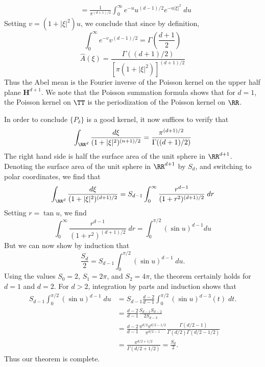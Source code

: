 \begin{example}
\begin{align*}
        &= \frac{1}{\pi^{(d + 1)/2}} \int_0^\infty e^{-u} u^{(d-1)/2} e^{- u|\xi|^2}\; du
    \end{align*}
    Setting $v = (1 + |\xi|^2) u$, we conclude that since by definition,
    \[ \int_0^\infty e^{-v} v^{(d-1)/2} = \Gamma \left( \frac{d+1}{2} \right) \]
    \[ \widehat{A}(\xi) = \frac{\Gamma((d+1)/2)}{[\pi(1 + |\xi|^2)]^{(d+1)/2}} \]
    Thus the Abel mean is the Fourier inverse of the Poisson kernel on the upper half plane $\mathbf{H}^{d+1}$. We note that the Poisson summation formula shows that for $d = 1$, the Poisson kernel on $\TT$ is the periodization of the Poisson kernel on $\RR$.

    In order to conclude $\{ P_\delta \}$ is a good kernel, it now suffices to verify that
    \[ \int_{\RR^d} \frac{d\xi}{(1 + |\xi|^2)^{(n+1)/2}} = \frac{\pi^{(d+1)/2}}{\Gamma((d+1)/2)} \]
    The right hand side is half the surface area of the unit sphere in $\RR^{d+1}$. Denoting the surface area of the unit sphere in $\RR^{d+1}$ by $S_d$, and switching to polar coordinates, we find that
    \[ \int_{\RR^d} \frac{d\xi}{(1 + |\xi|^2)^{(d+1)/2}} = S_{d-1} \int_0^\infty \frac{r^{d-1}}{(1 + r^2)^{(d+1)/2}}\; dr \]
    Setting $r = \tan u$, we find
    \[ \int_0^\infty \frac{r^{d-1}}{(1 + r^2)^{(d+1)/2}}\; dr = \int_0^{\pi/2} (\sin u)^{d-1} du \]
    But we can now show by induction that
    \[ \frac{S_d}{2} = S_{d-1} \int_0^{\pi/2} (\sin u)^{d-1}\; du. \]
    Using the values $S_0 = 2$, $S_1 = 2\pi$, and $S_2 = 4\pi$, the theorem certainly holds for $d = 1$ and $d = 2$. For $d > 2$, integration by parts and induction shows that
    \begin{align*}
        S_{d-1} \int_0^{\pi/2} (\sin u)^{d-1}\; du &= S_{d-1} \frac{d-2}{d-1} \int_0^{\pi/2} (\sin u)^{d-3}(t)\; dt.\\
        &= \frac{d-2}{d-1} \frac{S_{d-1} S_{d-2}}{2S_{d-3}}\\
        &= \frac{d-2}{d-1} \frac{\pi^{d/2} \pi^{d/2-1/2}}{\pi^{d/2-1}} \frac{\Gamma(d/2 - 1)}{\Gamma(d/2) \Gamma(d/2 - 1/2)}\\
        &= \frac{\pi^{d/2+1/2}}{\Gamma(d/2 + 1/2)} = \frac{S_d}{2}.
    \end{align*}
    Thus our theorem is complete.
\end{example}


